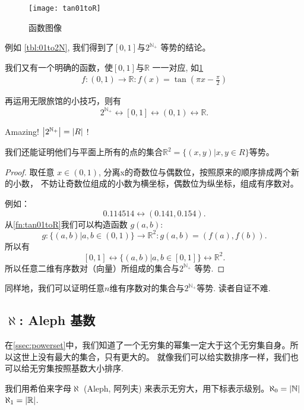 \documentclass[UTF8]{mathrep}
\begin{document}
\begin{figure}
	\begin{center}
		\texttt{[image: tan01toR]}
		\caption{函数图像} \label{fig:tan}
	\end{center}
\end{figure}

例如 \cref{tbl:01to2N},
我们得到了$\left[0,1\right]$与$2^{\mathbb{N}_+} $ 等势的结论。

我们又有一个明确的函数，使$\left[0,1\right]$与$\mathbb{R}$ 一一对应, 如\cref{fig:tan}
\begin{align}
	f \colon (0,1) \to \mathbb{R} \colon f(x) = \tan (\pi x - \frac{\pi}{2}) \label{fn:tan01toR}
\end{align}

再运用无限旅馆的小技巧，则有
\[
	2^{\mathbb{N}_+}\leftrightarrow [0,1] \leftrightarrow (0,1) \leftrightarrow \mathbb{R}
	.\]

Amazing! $\left\lvert 2^{\mathbb{N}_+} \right\rvert = \left\lvert R \right\rvert$ !

我们还能证明他们与平面上所有的点的集合$\mathbb{R}^{2} = \{(x,y)| x, y \in R\} $等势。

\begin{proof}

	取任意 $x \in (0,1)$, 分离x的奇数位与偶数位，按照原来的顺序排成两个新的小数，
	不妨让奇数位组成的小数为横坐标，偶数位为纵坐标，组成有序数对。

	例如：
	\[
		0.114514 \leftrightarrow (0.141, 0.154)
		.\]
	从\cref{fn:tan01toR}我们可以构造函数 $g(a,b)$:
	\[
		g \colon \{(a,b) | a, b \in (0,1) \}  \to \mathbb{R}^{2}  \colon g(a,b) = (f(a), f(b))
		.\]
	所以有
	\[
		[0,1] \leftrightarrow \{(a,b)| a,b \in [0,1]\} \leftrightarrow \mathbb{R}^{2}
		.\]
	所以任意二维有序数对（向量）所组成的集合与$2^{\mathbb{N}_+} $ 等势.
\end{proof}

同样地，我们可以证明任意$n$维有序数对的集合与$2^{\mathbb{N}_+} $等势. 读者自证不难.

\subsection{\texorpdfstring{$\aleph $: Aleph 基数}{Aleph 基数}}

在\cref{ssec:powerset}中，我们知道了一个无穷集的幂集一定大于这个无穷集自身。所以这世上没有最大的集合，只有更大的。
就像我们可以给实数排序一样，我们也可以给无穷集按照基数大小排序.

我们用希伯来字母$\aleph$ (Aleph, 阿列夫) 来表示无穷大，用下标表示级别。$\aleph_0 = \left\lvert \mathbb{N} \right\rvert$
$\aleph_1 = \left\lvert \mathbb{R} \right\rvert$.
\end{document}
